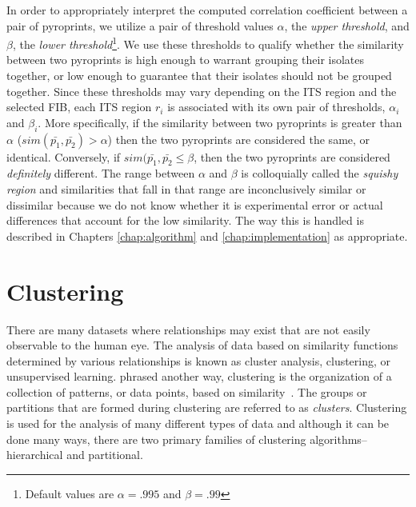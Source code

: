 \documentclass[12pt]{ucthesis}
\begin{document}
      In order to appropriately interpret the computed correlation coefficient
      between a pair of pyroprints, we utilize a pair of threshold values
      $\alpha$, the \textit{upper threshold}, and $\beta$, the \textit{lower
      threshold}\footnote{Default values are $\alpha = .995$ and $\beta =
      .99$}. We use these thresholds to qualify whether the
      similarity between two pyroprints is high enough to warrant grouping
      their isolates together, or low enough to guarantee that their isolates
      should not be grouped together. Since these thresholds may vary depending
      on the ITS region and the selected FIB, each ITS region
      $r_i$ is associated with its own pair of thresholds, $\alpha_i$ and $\beta_i$.
      More specifically, if the similarity between two pyroprints is greater
      than $\alpha$ ($sim(\bar{p_1}, \bar{p_2}) > \alpha$) then the two
      pyroprints are considered the same, or identical. Conversely, if
      $sim(\bar{p_1}, \bar{p_2} \le \beta$, then the two pyroprints are
      considered \textit{definitely} different. The range between $\alpha$ and
      $\beta$ is colloquially called the \textit{squishy region} and
      similarities that fall in that range are inconclusively similar or
      dissimilar because we do not know whether it is experimental error or
      actual differences that account for the low similarity. The way this is
      handled is described in Chapters \ref{chap:algorithm} and
      \ref{chap:implementation} as appropriate.

   \section{Clustering}\label{sec:clustering}
      There are many datasets where relationships may exist that are not easily
      observable to the human eye. The analysis of data based on similarity
      functions determined by various relationships is known as cluster
      analysis, clustering, or unsupervised learning. phrased another way,
      clustering is the organization of a collection of patterns, or data
      points, based on similarity~\cite{Jain:DataClustering}. The groups or
      partitions that are formed during clustering are referred to as
      \textit{clusters}. Clustering is used for the analysis of
      many different types of data and although it can be done many ways, there
      are two primary families of clustering algorithms--hierarchical and
      partitional.
\end{document}
